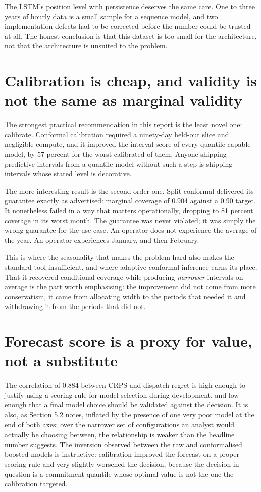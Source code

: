 \documentclass[11pt,a4paper,oneside]{report}
\begin{document}
The LSTM's position level with persistence deserves the same care. One to three years of hourly data is a small sample for a sequence model, and two implementation defects had to be corrected before the number could be trusted at all. The honest conclusion is that this dataset is too small for the architecture, not that the architecture is unsuited to the problem.

\section{Calibration is cheap, and validity is not the same as marginal validity}

The strongest practical recommendation in this report is the least novel one: calibrate. Conformal calibration required a ninety-day held-out slice and negligible compute, and it improved the interval score of every quantile-capable model, by 57 percent for the worst-calibrated of them. Anyone shipping predictive intervals from a quantile model without such a step is shipping intervals whose stated level is decorative.

The more interesting result is the second-order one. Split conformal delivered its guarantee exactly as advertised: marginal coverage of 0.904 against a 0.90 target. It nonetheless failed in a way that matters operationally, dropping to 81 percent coverage in its worst month. The guarantee was never violated; it was simply the wrong guarantee for the use case. An operator does not experience the average of the year. An operator experiences January, and then February.

This is where the seasonality that makes the problem hard also makes the standard tool insufficient, and where adaptive conformal inference earns its place. That it recovered conditional coverage while producing \emph{narrower} intervals on average is the part worth emphasising: the improvement did not come from more conservatism, it came from allocating width to the periods that needed it and withdrawing it from the periods that did not.

\section{Forecast score is a proxy for value, not a substitute}

The correlation of 0.884 between CRPS and dispatch regret is high enough to justify using a scoring rule for model selection during development, and low enough that a final model choice should be validated against the decision. It is also, as Section 5.2 notes, inflated by the presence of one very poor model at the end of both axes; over the narrower set of configurations an analyst would actually be choosing between, the relationship is weaker than the headline number suggests. The inversion observed between the raw and conformalised boosted models is instructive: calibration improved the forecast on a proper scoring rule and very slightly worsened the decision, because the decision in question is a commitment quantile whose optimal value is not the one the calibration targeted.
\end{document}
